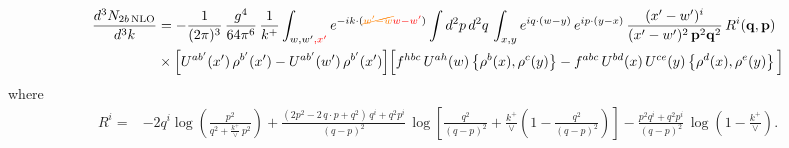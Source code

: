 \documentclass[9pt]{article}
\numberwithin{equation}{section}
\begin{document}
\begin{align}
\frac{d^{3}N_{2b\,\rm NLO}}{d^{3}k} & = -\frac{1}{(2\pi)^{3}}\,\frac{g^{4}}{64\pi^{6}}\,\frac{1}{k^{+}}\int_{w,w'{\color{red},x'}} e^{-ik\cdot({\color{orange}\cancel{w'-w}}{\color{red}w-w'})}
\int d^{2}p\,d^{2}q\,\int_{x,y} e^{iq\cdot(w-y)}\,e^{ip\cdot(y-x)}\,\frac{(x'-w')^{i}}{(x'-w')^{2}\,\mathbf{p}^{2}\mathbf{q}^{2}}\,R^{i}(\mathbf{q},\mathbf{p})\notag\\
&\times\Big[U^{ab'}(x')\,\rho^{b'}(x')-U^{ab'}(w')\,\rho^{b'}(x')\Big]
\Big[f^{hbc}\,U^{ah}(w)\left\{\rho^{b}(x),\rho^{c}(y)\right\}-f^{abc}\,U^{bd}(x)\,U^{ce}(y)\left\{\rho^{d}(x),\rho^{e}(y)\right\}\Big]
\end{align}
where
\begin{align}
R^{i} =& -2q^{i}\log\left(\frac{p^{2}}{q^{2}+\frac{k^{+}}{\vee}\,p^{2}}\right)
+\frac{(2p^{2}-2\,q\cdot p+q^{2})\,q^{i}+q^{2}p^{i}}{(q-p)^{2}}\,
\log\left[\frac{q^{2}}{(q-p)^{2}}+\frac{k^{+}}{\vee}\left(1-\frac{q^{2}}{(q-p)^{2}}\right)\right]
-\frac{p^{2}q^{i}+q^{2}p^{i}}{(q-p)^{2}}\,\log\left(1-\frac{k^{+}}{\vee}\right).
\end{align}
\end{document}
